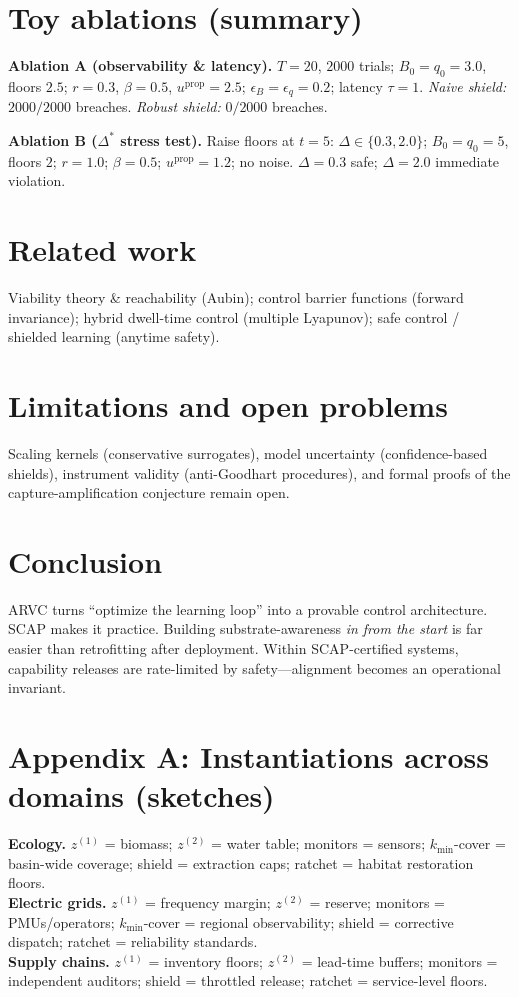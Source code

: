 \documentclass[11pt]{article}
\theoremstyle{definition}
\begin{document}
\section{Toy ablations (summary)}
\textbf{Ablation A (observability \& latency).}
$T=20$, $2000$ trials; $B_0=q_0=3.0$, floors $2.5$; $r=0.3$, $\beta=0.5$, $u^{\mathrm{prop}}=2.5$; $\epsilon_B=\epsilon_q=0.2$; latency $\tau=1$. \emph{Naive shield:} $2000/2000$ breaches. \emph{Robust shield:} $0/2000$ breaches.

\textbf{Ablation B ($\Delta^\ast$ stress test).}
Raise floors at $t=5$: $\Delta\in\{0.3,2.0\}$; $B_0=q_0=5$, floors $2$; $r=1.0$; $\beta=0.5$; $u^{\mathrm{prop}}=1.2$; no noise. $\Delta=0.3$ safe; $\Delta=2.0$ immediate violation.

\section{Related work}
Viability theory \& reachability (Aubin); control barrier functions (forward invariance); hybrid dwell-time control (multiple Lyapunov); safe control / shielded learning (anytime safety).

\section{Limitations and open problems}
Scaling kernels (conservative surrogates), model uncertainty (confidence-based shields), instrument validity (anti-Goodhart procedures), and formal proofs of the capture-amplification conjecture remain open.

\section{Conclusion}
ARVC turns ``optimize the learning loop'' into a provable control architecture. SCAP makes it practice. Building substrate-awareness \emph{in from the start} is far easier than retrofitting after deployment. Within SCAP-certified systems, capability releases are rate-limited by safety---alignment becomes an operational invariant.

\appendix
\section*{Appendix A: Instantiations across domains (sketches)}
\textbf{Ecology.} $z^{(1)}$ = biomass; $z^{(2)}$ = water table; monitors = sensors; $k_{\min}$-cover = basin-wide coverage; shield = extraction caps; ratchet = habitat restoration floors.\\
\textbf{Electric grids.} $z^{(1)}$ = frequency margin; $z^{(2)}$ = reserve; monitors = PMUs/operators; $k_{\min}$-cover = regional observability; shield = corrective dispatch; ratchet = reliability standards.\\
\textbf{Supply chains.} $z^{(1)}$ = inventory floors; $z^{(2)}$ = lead-time buffers; monitors = independent auditors; shield = throttled release; ratchet = service-level floors.
\end{document}
